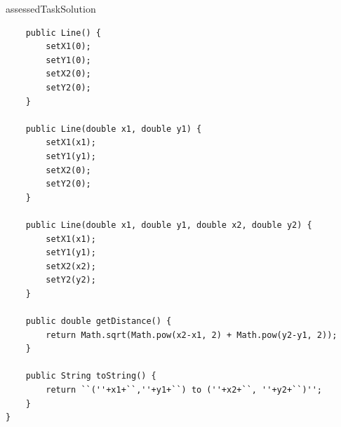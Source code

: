 \begin{questions}
\begin{taggedblock}{assessedTaskSolution}
\begin{solution}
\begin{lstlisting}
	public Line() {
		setX1(0);
		setY1(0);
		setX2(0);
		setY2(0);
	}
	
	public Line(double x1, double y1) {
		setX1(x1);
		setY1(y1);
		setX2(0);
		setY2(0);
	}
	
	public Line(double x1, double y1, double x2, double y2) {
		setX1(x1);
		setY1(y1);
		setX2(x2);
		setY2(y2);
	}
	
	public double getDistance() {
		return Math.sqrt(Math.pow(x2-x1, 2) + Math.pow(y2-y1, 2));
	}
	
	public String toString() {
		return ``(''+x1+``,''+y1+``) to (''+x2+``, ''+y2+``)'';
	}
}

\end{lstlisting}
\end{solution}
\end{taggedblock}

\end{questions}



